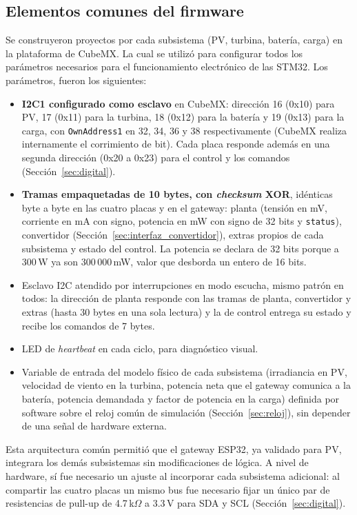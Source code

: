 \documentclass[conference]{IEEEtran}
\begin{document}
\subsection{Elementos comunes del firmware}
\label{sec:firmware_comun}

Se construyeron proyectos por cada subsistema (PV, turbina, batería, carga) en la plataforma de CubeMX. La cual se utilizó para configurar todos los parámetros necesarios para el funcionamiento electrónico de las STM32. Los parámetros, fueron los siguientes:

\begin{itemize}
\item \textbf{I2C1 configurado como esclavo} en CubeMX: dirección 16 (0x10) para PV, 17 (0x11) para la turbina, 18 (0x12) para la batería y 19 (0x13) para la carga, con \texttt{OwnAddress1} en 32, 34, 36 y 38 respectivamente (CubeMX realiza internamente el corrimiento de bit). Cada placa responde además en una segunda dirección (0x20 a 0x23) para el control y los comandos (Sección~\ref{sec:digital}).
\item \textbf{Tramas empaquetadas de 10 bytes, con \emph{checksum} XOR}, idénticas byte a byte en las cuatro placas y en el gateway: planta (tensión en mV, corriente en mA con signo, potencia en mW con signo de 32 bits y \texttt{status}), convertidor (Sección~\ref{sec:interfaz_convertidor}), extras propios de cada subsistema y estado del control. La potencia se declara de 32 bits porque a 300\,W ya son 300\,000\,mW, valor que desborda un entero de 16 bits.
\item Esclavo I2C atendido por interrupciones en modo escucha, mismo patrón en todos: la dirección de planta responde con las tramas de planta, convertidor y extras (hasta 30 bytes en una sola lectura) y la de control entrega su estado y recibe los comandos de 7 bytes.
\item LED de \emph{heartbeat} en cada ciclo, para diagnóstico visual.
\item Variable de entrada del modelo físico de cada subsistema (irradiancia en PV, velocidad de viento en la turbina, potencia neta que el gateway comunica a la batería, potencia demandada y factor de potencia en la carga) definida por software sobre el reloj común de simulación (Sección~\ref{sec:reloj}), sin depender de una señal de hardware externa.
\end{itemize}

Esta arquitectura común permitió que el gateway ESP32, ya validado para PV, integrara los demás subsistemas sin modificaciones de lógica. A nivel de hardware, sí fue necesario un ajuste al incorporar cada subsistema adicional: al compartir las cuatro placas un mismo bus fue necesario fijar un único par de resistencias de pull-up de 4.7\,k$\Omega$ a 3.3\,V para SDA y SCL (Sección~\ref{sec:digital}). %
\end{document}
